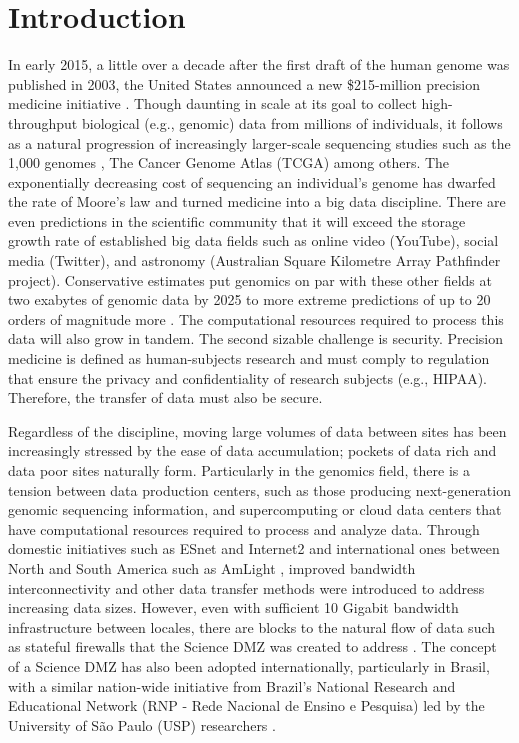 \documentclass{sig-alternate-05-2015}
\begin{document}


\section{Introduction}

In early 2015, a little over a decade after the first draft of the human genome was published in 2003, the United States announced a new \$215-million precision medicine initiative \cite{TheWhiteHouse}. Though daunting in scale at its goal to collect high-throughput biological (e.g., genomic) data from millions of individuals, it follows as a natural progression of increasingly larger-scale sequencing studies such as the 1,000 genomes \cite{Altshuler2010}, The Cancer Genome Atlas (TCGA) among others. The exponentially decreasing cost of sequencing an individual's genome has dwarfed the rate of Moore's law and turned medicine into a big data discipline. There are even predictions in the scientific community that it will exceed the storage growth rate of established big data fields such as online video (YouTube), social media (Twitter), and astronomy (Australian Square Kilometre Array Pathfinder project). Conservative estimates put genomics on par with these other fields at two exabytes of genomic data by 2025 to more extreme predictions of up to 20 orders of magnitude more \cite{Stephens2015}. The computational resources required to process this data will also grow in tandem. The second sizable challenge is security. Precision medicine is defined as human-subjects research and must comply to regulation that ensure the privacy and confidentiality of research subjects (e.g., HIPAA). Therefore, the transfer of data must also be secure.

Regardless of the discipline, moving large volumes of data between sites has been increasingly stressed by the ease of data accumulation; pockets of data rich and data poor sites naturally form. Particularly in the genomics field, there is a tension between data production centers, such as those producing next-generation genomic sequencing information, and supercomputing or cloud data centers that have computational resources required to process and analyze data. Through domestic initiatives such as ESnet and Internet2 and international ones between North and South America such as AmLight \cite{Ibarra2015}, improved bandwidth interconnectivity and other data transfer methods were introduced to address increasing data sizes. However, even with sufficient 10 Gigabit bandwidth infrastructure between locales, there are blocks to the natural flow of data such as stateful firewalls that the Science DMZ was created to address \cite{Dart2013}. The concept of a Science DMZ has also been adopted internationally, particularly in Brasil, with a similar nation-wide initiative from Brazil's National Research and Educational Network (RNP - Rede Nacional de Ensino e Pesquisa) led by the University of S\~{a}o Paulo (USP) researchers \cite{Magri2014}.
\end{document}
